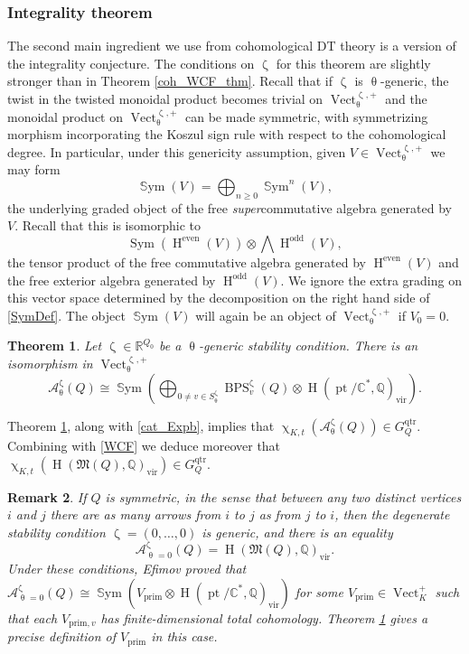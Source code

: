 \documentclass{amsart}
\DeclareMathOperator{\Vect}{Vect}
\DeclareMathOperator{\pt}{pt}
\newcommand{\Mst}{\mathfrak{M}}
\newcommand{\QQ}{\mathbb{Q}}
\DeclareMathOperator{\Sym}{\mathbb{S}ym}
\DeclareMathOperator{\CSym}{Sym}
\DeclareMathOperator{\HO}{H}
\DeclareMathOperator{\qtrop}{qtr}
\DeclareMathOperator{\BPS}{BPS}
\DeclareMathOperator{\vir}{vir}
\renewcommand{\theta}{\uptheta}
\renewcommand{\zeta}{\upzeta}
\renewcommand{\chi}{\upchi}
\theoremstyle{plain}%
\newtheorem{thm}{Theorem}[section]
\newtheorem{rem}[thm]{Remark}
\theoremstyle{definition}
\theoremstyle{remark}
\begin{document}
\subsubsection{Integrality theorem}
The second main ingredient we use from cohomological DT theory is a  version of the integrality conjecture.  The conditions on $\zeta$ for this theorem are slightly stronger than in Theorem \ref{coh_WCF_thm}. Recall that if $\zeta$ is $\theta$-generic, the twist in the twisted monoidal product becomes trivial on $\Vect^{\zeta,+}_{\theta}$ and the monoidal product on $\Vect^{\zeta,+}_{\theta}$ can be made symmetric, with symmetrizing morphism incorporating the Koszul sign rule with respect to the cohomological degree.  In particular, under this genericity assumption, given $V\in \Vect^{\zeta,+}_{\theta}$ we may form
\begin{equation}
\label{SymDef}
\Sym(V)=\bigoplus_{n\geq 0}\Sym^n(V),
\end{equation}
the underlying graded object of the free \textit{super}commutative algebra generated by $V$.  Recall that this is isomorphic to 
\[
\CSym\left(\HO^{\textrm{even}}(V)\right)\otimes \bigwedge \HO^{\textrm{odd}}(V),
\]
the tensor product of the free commutative algebra generated by $\HO^{\textrm{even}}(V)$ and the free exterior algebra generated by $\HO^{\textrm{odd}}(V)$.  We ignore the extra grading on this vector space determined by the decomposition on the right hand side of \eqref{SymDef}. 
The object $\Sym(V)$ will again be an object of $\Vect^{\zeta,+}_{\theta}$ if $V_0=0$.
\begin{thm}\label{coh_int_thm}\cite[Thm. A]{DavMei}
Let $\zeta\in \mathbb{R}^{Q_0}$ be a $\theta$-generic stability condition.  There is an isomorphism in $\Vect^{\zeta,+}_{\theta}$
\begin{equation}
\label{CIE}
\mathcal{A}_{\theta}^{\zeta}(Q)\cong \Sym\left(\bigoplus_{0\neq v\in S_{\theta}^{\zeta}}\BPS_v^{\zeta}(Q)\otimes \HO(\pt/\mathbb{C}^*,\mathbb{Q})_{\vir}\right).
\end{equation}
\end{thm}
Theorem \ref{coh_int_thm}, along with \eqref{cat_Expb}, implies that $\chi_{K,t}(\mathcal{A}_{\theta}^{\zeta}(Q))\in G^{\qtrop}_Q$.  Combining with \eqref{WCF} we deduce moreover that $\chi_{K,t}\left(\HO(\Mst(Q),\mathbb{Q})_{\vir}\right)\in G^{\qtrop}_Q$.
\begin{rem}
If $Q$ is symmetric, in the sense that between any two distinct vertices $i$ and $j$ there are as many arrows from $i$ to $j$ as from $j$ to $i$, then the degenerate stability condition $\zeta=(0,\ldots,0)$ is generic, and there is an equality
\[
\mathcal{A}_{\theta=0}^{\zeta}(Q)=\HO(\Mst(Q),\QQ)_{\vir}.
\]
Under these conditions, Efimov \cite{Efi} proved that $\mathcal{A}_{\theta=0}^{\zeta}(Q)\cong \Sym\left(V_{\mathrm{prim}}\otimes \HO(\pt/\mathbb{C}^*,\mathbb{Q})_{\vir}\right)$ for some $V_{\mathrm{prim}}\in \Vect^+_K$ such that each $V_{\mathrm{prim},v}$ has finite-dimensional total cohomology.  Theorem \ref{coh_int_thm} gives a precise definition of $V_{\mathrm{prim}}$ in this case.
\end{rem}
\end{document}
